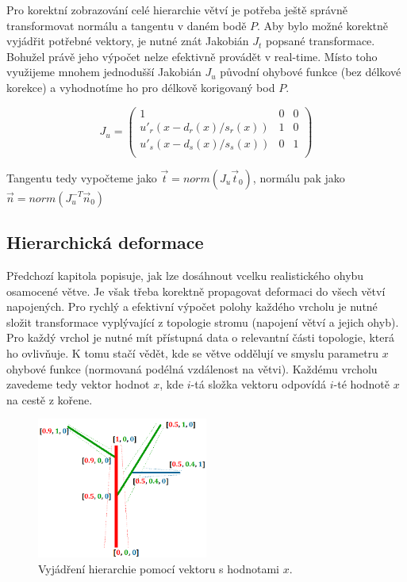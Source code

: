 Pro korektní zobrazování celé hierarchie větví je potřeba ještě správně transformovat normálu a tangentu v daném bodě $P$. Aby bylo možné korektně vyjádřit potřebné vektory, je nutné znát Jakobián $J_t$ popsané transformace. Bohužel právě jeho výpočet nelze efektivně provádět v real-time. Místo toho využijeme mnohem jednodušší Jakobián $J_u$ původní ohybové funkce (bez délkové korekce) a vyhodnotíme ho pro délkově korigovaný bod $P$.

\begin{equation}
J_{u} = \begin{pmatrix}
1 & 0 &0 \\
{u}'_r(x-d_r(x)/s_r(x)) & 1 & 0\\
{u}'_s(x-d_s(x)/s_s(x)) & 0 & 1\\
\end{pmatrix}
\end{equation}

Tangentu tedy vypočteme jako $\vec{t} = norm(J_{u}\vec{t}_{0})$, normálu pak jako $\vec{n} = norm(J_{u}^{-T}\vec{n}_{0})$

\subsection{Hierarchická deformace}

Předchozí kapitola popisuje, jak lze dosáhnout vcelku realistického ohybu osamocené větve. Je však třeba korektně propagovat deformaci do všech větví napojených. Pro rychlý a efektivní výpočet polohy každého vrcholu je nutné složit transformace vyplývající z topologie stromu (napojení větví a jejich ohyb). Pro každý vrchol je nutné mít přístupná data o relevantní části topologie, která ho ovlivňuje. K tomu stačí vědět, kde se větve oddělují ve smyslu parametru $x$ ohybové funkce (normovaná podélná vzdálenost na větvi). Každému vrcholu zavedeme tedy vektor hodnot $x$, kde $i$-tá složka vektoru odpovídá $i$-té hodnotě $x$ na cestě z kořene.
 
\begin{figure}[!hbt]
\begin{center}
\includegraphics[width=0.5\textwidth]{./figures/branchHierarchy.png}
\end{center}
\caption[Vyjádření hierarchie]%
{ Vyjádření hierarchie pomocí vektoru s hodnotami $x$.
\label{fig:hierarchyCoords}
}
\end{figure}

